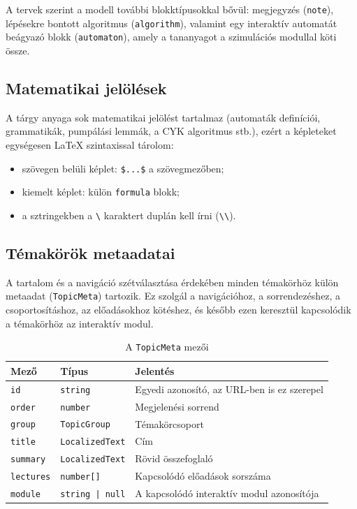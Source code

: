 \documentclass[12pt,a4paper]{report}
\begin{document}
A tervek szerint a modell további blokktípusokkal bővül: megjegyzés
(\texttt{note}), lépésekre bontott algoritmus (\texttt{algorithm}),
valamint egy interaktív automatát beágyazó blokk (\texttt{automaton}),
amely a tananyagot a szimulációs modullal köti össze.

\subsection{Matematikai jelölések}

A tárgy anyaga sok matematikai jelölést tartalmaz (automaták
definíciói, grammatikák, pumpálási lemmák, a CYK algoritmus stb.),
ezért a képleteket egységesen \LaTeX{} szintaxissal tárolom:

\begin{itemize}
    \item szövegen belüli képlet: \verb|$...$| a szövegmezőben;
    \item kiemelt képlet: külön \texttt{formula} blokk;
    \item a sztringekben a \verb|\| karaktert duplán kell írni
          (\verb|\\|).
\end{itemize}

\subsection{Témakörök metaadatai}

A tartalom és a navigáció szétválasztása érdekében minden témakörhöz
külön metaadat (\texttt{TopicMeta}) tartozik. Ez szolgál a
navigációhoz, a sorrendezéshez, a csoportosításhoz, az előadásokhoz
kötéshez, és később ezen keresztül kapcsolódik a témakörhöz az
interaktív modul.

\begin{table}[htbp]
    \centering
    \begin{tabularx}{\textwidth}{l l X}
        \toprule
        \textbf{Mező} & \textbf{Típus} & \textbf{Jelentés} \\
        \midrule
        \texttt{id}       & \texttt{string}        & Egyedi azonosító, az URL-ben is ez szerepel \\
        \texttt{order}    & \texttt{number}        & Megjelenési sorrend \\
        \texttt{group}    & \texttt{TopicGroup}    & Témakörcsoport \\
        \texttt{title}    & \texttt{LocalizedText} & Cím \\
        \texttt{summary}  & \texttt{LocalizedText} & Rövid összefoglaló \\
        \texttt{lectures} & \texttt{number[]}      & Kapcsolódó előadások sorszáma \\
        \texttt{module}   & \texttt{string | null} & A kapcsolódó interaktív modul azonosítója \\
        \bottomrule
    \end{tabularx}
    \caption{A \texttt{TopicMeta} mezői}
    \label{tab:topicmeta}
\end{table}
\end{document}
